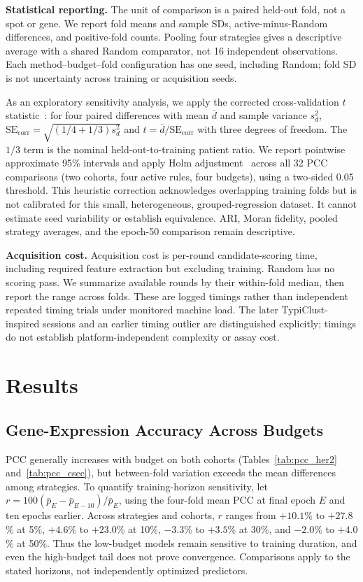 \documentclass[]{spie}
\begin{document}
\noindent\textbf{Statistical reporting.}
The unit of comparison is a paired held-out fold, not a spot or gene. We report fold means and sample SDs, active-minus-Random differences, and positive-fold counts. Pooling four strategies gives a descriptive average with a shared Random comparator, not 16 independent observations. Each method--budget--fold configuration has one seed, including Random; fold SD is not uncertainty across training or acquisition seeds.

As an exploratory sensitivity analysis, we apply the corrected cross-validation $t$ statistic~\cite{bouckaert2004replicability}: for four paired differences with mean $\bar d$ and sample variance $s_d^2$, $\mathrm{SE}_{\mathrm{corr}}=\sqrt{(1/4+1/3)s_d^2}$ and $t=\bar d/\mathrm{SE}_{\mathrm{corr}}$ with three degrees of freedom. The $1/3$ term is the nominal held-out-to-training patient ratio. We report pointwise approximate 95\% intervals and apply Holm adjustment~\cite{holm1979simple} across all 32 PCC comparisons (two cohorts, four active rules, four budgets), using a two-sided 0.05 threshold. This heuristic correction acknowledges overlapping training folds but is not calibrated for this small, heterogeneous, grouped-regression dataset. It cannot estimate seed variability or establish equivalence. ARI, Moran fidelity, pooled strategy averages, and the epoch-50 comparison remain descriptive.

\noindent\textbf{Acquisition cost.}
Acquisition cost is per-round candidate-scoring time, including required feature extraction but excluding training. Random has no scoring pass. We summarize available rounds by their within-fold median, then report the range across folds. These are logged timings rather than independent repeated timing trials under monitored machine load. The later TypiClust-inspired sessions and an earlier timing outlier are distinguished explicitly; timings do not establish platform-independent complexity or assay cost.

\section{Results}
\label{sec:results}

\subsection{Gene-Expression Accuracy Across Budgets}

PCC generally increases with budget on both cohorts (Tables~\ref{tab:pcc_her2} and~\ref{tab:pcc_cscc}), but between-fold variation exceeds the mean differences among strategies. To quantify training-horizon sensitivity, let $r=100(\bar p_E-\bar p_{E-10})/\bar p_E$, using the four-fold mean PCC at final epoch $E$ and ten epochs earlier. Across strategies and cohorts, $r$ ranges from $+10.1$\% to $+27.8$\% at 5\%, $+4.6$\% to $+23.0$\% at 10\%, $-3.3$\% to $+3.5$\% at 30\%, and $-2.0$\% to $+4.0$\% at 50\%. Thus the low-budget models remain sensitive to training duration, and even the high-budget tail does not prove convergence. Comparisons apply to the stated horizons, not independently optimized predictors.
\end{document}
